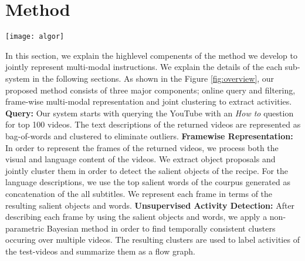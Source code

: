 \section{Method}
\begin{figure*}[t]
  \texttt{[image: algor]}
  \label{fig:overview}
  \caption{Components of our recipe understanding method. \textbf{Query:} We query the YouTube for top 100 \emph{How To} videos and filter the outliers; \textbf{Framewise Representation:} We automatically extract object clusters and salient word in order to find multi-modal representation of each frame. \textbf{Unsupervised Activity Detection:} We jointly cluster videos in order to learn activities/steps related to the recipe.}
\end{figure*}

In this section, we explain the highlevel compenents of the method we develop to jointly represent multi-modal instructions. We explain the details of the each sub-system in the following sections. As shown in the Figure \ref{fig:overview}, our proposed method consists of three major components; online query and filtering, frame-wise multi-modal representation and joint clustering to extract activities. \textbf{Query:} Our system starts with querying the YouTube with an \emph{How to} question for top 100 videos. The text descriptions of the returned videos are represented as bag-of-words and clustered to eliminate outliers. \textbf{Framewise Representation:} In order to represent the frames of the returned videos, we process both the visual and language content of the videos. We extract object proposals and jointly cluster them in order to detect the salient objects of the recipe. For the language descriptions, we use the top salient words of the courpus generated as concatenation of the all subtitles. We represent each frame in terms of the resulting salient objects and words. \textbf{Unsupervised Activity Detection:} After describing each frame by using the salient objects and words, we apply a non-parametric Bayesian method in order to find temporally consistent clusters occuring over multiple videos. The resulting clusters are used to label activities of the test-videos and summarize them as a flow graph.
